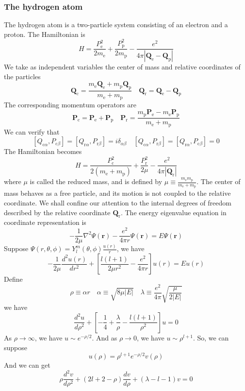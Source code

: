 \subsubsection{The hydrogen atom}
The hydrogen atom is a two-particle system consisting of an electron and a proton. The Hamiltonian is
\[H = \frac{P_{\mathrm{e}}^2}{2m_{\mathrm{e}}} + \frac{P_{\mathrm{p}}^2}{2m_{\mathrm{p}}} - \frac{e^2}{4\pi|\bm{Q}_{\mathrm{e}}-\bm{Q}_{\mathrm{p}}|}\]
We take as independent variables the center of mass and relative coordinates of the particles
\[\bm{Q}_{\mathrm{c}} = \frac{m_{\mathrm{e}}\bm{Q}_{\mathrm{e}} + m_{\mathrm{p}}\bm{Q}_{\mathrm{p}}}{m_{\mathrm{e}}+m_{\mathrm{p}}} \quad \bm{Q}_{\mathrm{r}} = \bm{Q}_{\mathrm{e}}-\bm{Q}_{\mathrm{p}}\]
The corresponding momentum operators are
\[\bm{P}_{\mathrm{c}} = \bm{P}_{\mathrm{e}} + \bm{P}_{\mathrm{p}} \quad \bm{P}_{\mathrm{r}} = \frac{m_{\mathrm{p}}\bm{P}_{\mathrm{e}}-m_{\mathrm{e}}\bm{P}_{\mathrm{p}}}{m_{\mathrm{e}} + m_{\mathrm{p}}}\]
We can verify that
\[[Q_{\mathrm{c}\alpha},P_{\mathrm{c}\beta}] = [Q_{\mathrm{r}\alpha},P_{\mathrm{r}\beta}] = i\delta_{\alpha\beta} \quad [Q_{\mathrm{c}\alpha},P_{\mathrm{r}\beta}] = [Q_{\mathrm{r}\alpha},P_{\mathrm{c}\beta}] = 0\]
The Hamiltonian becomes
\[H = \frac{P_{\mathrm{c}}^2}{2(m_{\mathrm{e}}+m_{\mathrm{p}})} + \frac{P_{\mathrm{r}}^2}{2\mu} - \frac{e^2}{4\pi|\bm{Q}_{\mathrm{r}}|}\]
where $\mu$ is called the reduced mass, and is defined by $\mu \equiv \frac{m_{\mathrm{e}}m_{\mathrm{p}}}{m_{\mathrm{e}}+m_{\mathrm{p}}}$.
The center of mass behaves as a free particle, and its
motion is not coupled to the relative coordinate. We shall confine our attention to the internal degrees of freedom described by the relative coordinate $\bm{Q}_{\mathrm{r}}$. The energy eigenvalue equation in coordinate representation is
\[-\frac{1}{2\mu}\nabla^2 \Psi(\bm{r})  -\frac{e^2}{4\pi r} \Psi(\bm{r}) = E\Psi(\bm{r})\]
Suppose $\Psi(r,\theta,\phi) = Y_l^m(\theta,\phi) \frac{u(r)}{r}$, we have
\[-\frac{1}{2\mu} \frac{d^2 u(r)}{dr^2} + \left[ \frac{l(l+1)}{2\mu r^2} - \frac{e^2}{4\pi r}\right]u(r) = Eu(r)\]
Define
\[\rho \equiv \alpha r \quad \alpha \equiv \sqrt{8\mu|E|} \quad \lambda \equiv \frac{e^2}{4\pi} \sqrt{\frac{\mu}{2|E|}}\]
we have
\[\frac{d^2 u}{d\rho^2} + \left[ -\frac{1}{4} + \frac{\lambda}{\rho} - \frac{l(l+1)}{\rho^2} \right] u = 0\]
As $\rho \to \infty$, we have $u \sim e^{-\rho/2}$. And as $\rho \to 0$, we have $u \sim \rho^{l+1}$. So, we can suppose
\[u(\rho) = \rho^{l+1} e^{-\rho/2} v(\rho)\]
And we can get
\[\rho \frac{d^2 v}{d\rho^2} + (2l+2-\rho)\frac{dv}{d\rho} + (\lambda-l-1)v = 0\]
